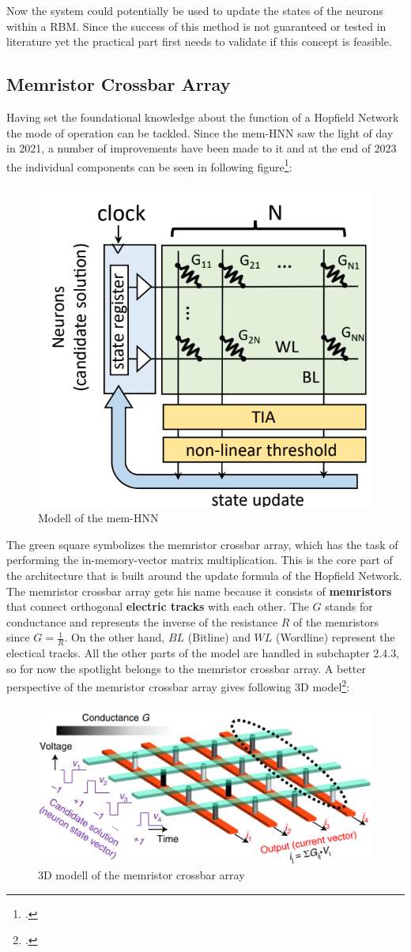 Now the system could potentially be used to update the states of the neurons within a \ac{RBM}.
Since the success of this method is not guaranteed or tested in literature yet the practical part first needs to validate if this concept is feasible.

\subsection{Memristor Crossbar Array}

Having set the foundational knowledge about the function of a Hopfield Network the mode of operation can be tackled. 
Since the \ac{mem-HNN} saw the light of day in 2021, a number of improvements have been made to it and at the end of 2023 the individual components can be seen in following figure\footcite[cf.][2]{hizzaniMemristorbasedHardwareAlgorithms2023}:
\begin{figure}[H]
    \centering
    \includegraphics[width=0.3\linewidth]{graphics/Mem_HNN_Modell.png}
    \caption{Modell of the \ac{mem-HNN}}
\end{figure}
The green square symbolizes the memristor crossbar array, which has the task of performing the in-memory-vector matrix multiplication. 
This is the core part of the architecture that is built around the update formula of the Hopfield Network. 
The memristor crossbar array gets his name because it consists of \textbf{memristors} that connect orthogonal \textbf{electric tracks} with each other.
The \( G \) stands for conductance and represents the inverse of the resistance \( R \) of the memristors since \( G = \frac{1}{R}\). On the other hand, \( BL \) (Bitline) and \( WL \) (Wordline) represent the electical tracks.
All the other parts of the model are handled in subchapter 2.4.3, so for now the spotlight belongs to the memristor crossbar array.
A better perspective of the memristor crossbar array gives following 3D model\footcite[cf.][410]{caiPowerefficientCombinatorialOptimization2020}:
\begin{figure}[H]
    \centering
    \includegraphics[width=0.65\linewidth]{graphics/memristor_crossbar_array.png}
    \caption{3D modell of the memristor crossbar array}
\end{figure}
